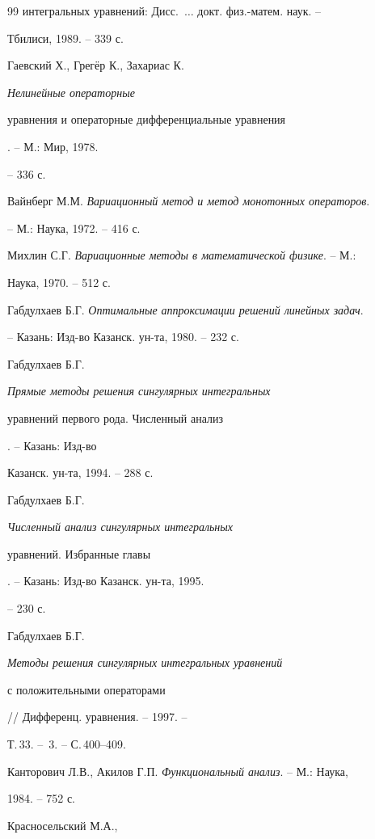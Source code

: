 \begin{thebibliography}{99}
{интегральных уравнений}: Дисс.~$\dotsc$ докт. физ.-матем. наук. -- 


Тбилиси, 1989. -- 339 с.




Гаевский Х., Грег\"ер К., Захариас К. {\em Нелинейные операторные 


уравнения и операторные дифференциальные уравнения}. -- М.: Мир, 1978. 


-- 336 с.




Вайнберг М.М. {\em Вариационный метод и метод монотонных операторов}. 


-- М.: Наука, 1972. -- 416 с.




Михлин С.Г. {\em Вариационные методы в математической физике}. -- М.: 


Наука, 1970. -- 512 с.




Габдулхаев Б.Г. {\em Оптимальные аппроксимации решений линейных задач}. 


-- Казань: Изд-во Казанск. ун-та, 1980. -- 232 с.




Габдулхаев Б.Г. {\em Прямые методы решения сингулярных интегральных 


уравнений первого рода. Численный анализ}. -- Казань: Изд-во 


Казанск. ун-та, 1994. -- 288 с.




Габдулхаев Б.Г. {\em Численный анализ сингулярных интегральных 


уравнений. Избранные главы}. -- Казань: Изд-во Казанск. ун-та, 1995. 


-- 230 с.




Габдулхаев Б.Г. {\em Методы решения сингулярных интегральных уравнений 


с положительными операторами} // Дифференц. уравнения. -- 1997. -- 


Т.\,33. -- \No\,3. -- С.\,400--409.




Канторович Л.В., Акилов Г.П. {\em Функциональный анализ}. -- М.: Наука, 


1984. -- 752 с.




Красносельский М.А., 



\end{thebibliography}
